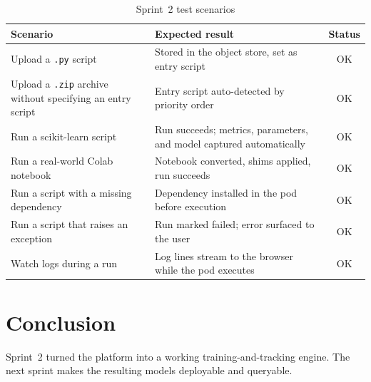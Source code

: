 \begin{table}[H]\centering
\renewcommand{\arraystretch}{1.25}
\caption{Sprint~2 test scenarios}\label{tab:tests-s2}
\begin{tabularx}{\textwidth}{|X|X|c|}
\hline
\textbf{Scenario} & \textbf{Expected result} & \textbf{Status}\\
\hline
Upload a \texttt{.py} script & Stored in the object store, set as entry script & OK\\ \hline
Upload a \texttt{.zip} archive without specifying an entry script & Entry script auto-detected by priority order & OK\\ \hline
Run a scikit-learn script & Run succeeds; metrics, parameters, and model captured automatically & OK\\ \hline
Run a real-world Colab notebook & Notebook converted, shims applied, run succeeds & OK\\ \hline
Run a script with a missing dependency & Dependency installed in the pod before execution & OK\\ \hline
Run a script that raises an exception & Run marked failed; error surfaced to the user & OK\\ \hline
Watch logs during a run & Log lines stream to the browser while the pod executes & OK\\ \hline
\end{tabularx}
\end{table}

\section*{Conclusion}
Sprint~2 turned the platform into a working training-and-tracking engine. The next
sprint makes the resulting models deployable and queryable.

